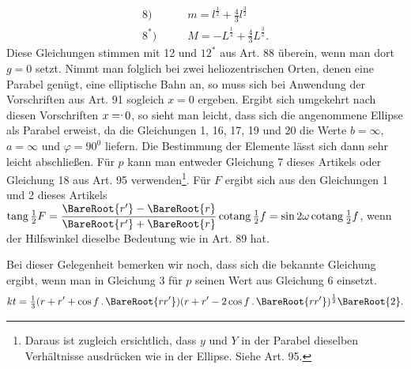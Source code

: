 \[
\begin{aligned}
\mathrm{8)}\qquad&m=l^{\frac12}+\tfrac43l^{\frac32}\\[.5em]
\mathrm{8^*)}\qquad&M=-L^{\frac12}+\tfrac43L^{\frac32}.
\end{aligned}
\]
\noindent Diese Gleichungen stimmen mit 12 und $12^*$ aus Art. 88 überein, wenn man dort $g=0$ setzt. Nimmt man folglich bei zwei heliozentrischen Orten, denen eine Parabel genügt, eine elliptische Bahn an, so muss sich bei Anwendung der Vorschriften aus Art. 91 sogleich $x=0$ ergeben. Ergibt sich umgekehrt nach diesen Vorschriften $x=\mathpunct{\raisebox{.65ex}{.}}0$, so sieht man leicht, dass sich die angenommene Ellipse als Parabel erweist, da die Gleichungen 1, 16, 17, 19 und 20 die Werte $b=\infty$, $a=\infty$ und $\varphi=90^0$ liefern. Die Bestimmung der Elemente lässt sich dann sehr leicht abschließen. Für $p$ kann man entweder Gleichung 7 dieses Artikels oder Gleichung 18 aus Art. 95 verwenden\footnote{Daraus ist zugleich ersichtlich, dass $y$ und $Y$ in der Parabel dieselben Verhältnisse ausdrücken wie in der Ellipse. Siehe Art. 95.}. Für $F$ ergibt sich aus den Gleichungen 1 und 2 dieses Artikels $\operatorname{tang}\tfrac12 F=\dfrac{\BareRoot{r'}-\BareRoot{r}}{\BareRoot{r'}+\BareRoot{r}}\operatorname{cotang}\tfrac12 f=\sin2\omega\operatorname{cotang}\tfrac12 f$, wenn der Hilfswinkel dieselbe Bedeutung wie in Art. 89 hat.

Bei dieser Gelegenheit bemerken wir noch, dass sich die bekannte Gleichung ergibt, wenn man in Gleichung 3 für $p$ seinen Wert aus Gleichung 6 einsetzt.
\[
kt=\tfrac13(r+r'+\cos f\,\mathpunct{.}\BareRoot{rr'})(r+r'-2\cos f\,\mathpunct{.}\BareRoot{rr'})^{\frac12}\BareRoot{2}.
\]
